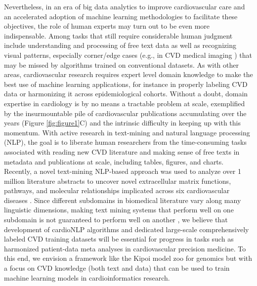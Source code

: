 \documentclass[letter]{bib}
\begin{document}
	Nevertheless, in an era of big data analytics to improve cardiovascular care \citep{Rumsfeld:2016:Big} and an accelerated adoption of machine learning methodologies to facilitate these objectives, the role of human experts may turn out to be even more indispensable. Among tasks that still require considerable human judgment include understanding and processing of free text data as well as recognizing visual patterns, especially corner/edge cases (e.g., in CVD medical imaging \citep{Slomka:2017:Cardiac,Fonseca:2011:Cardiac}) that may be missed by algorithms trained on conventional datasets.  As with other areas, cardiovascular research requires expert level domain knowledge to make the best use of machine learning applications, for instance in properly labeling CVD data or harmonizing it across epidemiological cohorts.  Without a doubt, domain expertise in cardiology is by no means a tractable problem at scale, exemplified by the insurmountable pile of cardiovascular publications accumulating over the years (Figure \ref{fig:figure1}C) and the intrinsic difficulty in keeping up with this momentum.  With active research in text-mining and natural language processing (NLP), the goal is to liberate human researchers from the time-consuming tasks associated with reading new CVD literature and making sense of free texts in metadata and publications at scale, including tables, figures, and charts.  Recently, a novel text-mining NLP-based approach was used to analyze over 1 million literature abstracts to uncover novel extracellular matrix functions, pathways, and molecular relationships implicated across six cardiovascular diseases \citep{Liem:2018:phrase}.  Since different subdomains in biomedical literature vary along many linguistic dimensions, making text mining systems that perform well on one subdomain is not guaranteed to perform well on another \citep{Lippincott:2011:Exploring, Kilicoglu:2018:Biomedical, Khomtchouk:2018:Biochat}, we believe that development of cardioNLP algorithms and dedicated large-scale comprehensively labeled CVD training datasets will be essential for progress in tasks such as harmonized patient-data meta analyses in cardiovascular precision medicine.  To this end, we envision a framework like the Kipoi model zoo for genomics \citep{Avsec:2019:Kipoi} but with a focus on CVD knowledge (both text and data) that can be used to train machine learning models in cardioinformatics research.  
	
\end{document}
